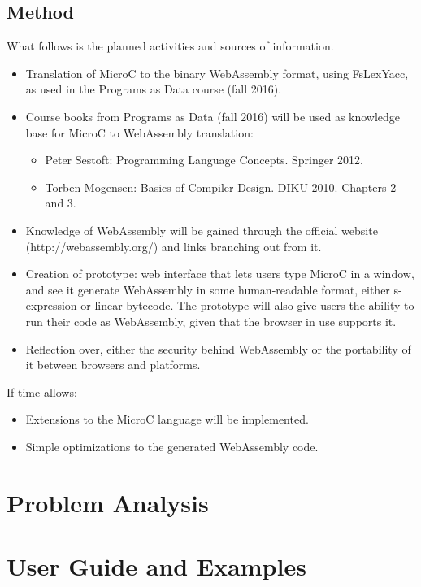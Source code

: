 \documentclass[a4paper]{article}
\makeatletter
\newcommand\footnoteref[1]{\protected@xdef\@thefnmark{\ref{#1}}\@footnotemark}
\makeatother
\begin{document}
\subsection{Method}
What follows is the planned activities and sources of information.
\begin{itemize}
	\item Translation of MicroC to the binary WebAssembly format, using FsLexYacc\footnoteref{footnote:fslexyacc-url}, as used in the Programs as Data course (fall 2016).
	\item Course books from Programs as Data (fall 2016) will be used as knowledge base for MicroC to WebAssembly translation:
		\begin{itemize}
			\item Peter Sestoft: Programming Language Concepts. Springer 2012.
			\item Torben Mogensen: Basics of Compiler Design. DIKU 2010. Chapters 2 and 3.
		\end{itemize}
	\item Knowledge of WebAssembly will be gained through the official website (http://webassembly.org/) and links branching out from it.
	\item Creation of prototype: web interface that lets users type MicroC in a window, and see it generate WebAssembly in some human-readable format, either s-expression or linear bytecode. The prototype will also give users the ability to run their code as WebAssembly, given that the browser in use supports it.
	\item Reflection over, either the security behind WebAssembly or the portability of it between browsers and platforms.
\end{itemize}

\noindent If time allows:
\begin{itemize}
	\item Extensions to the MicroC language will be implemented.
	\item Simple optimizations to the generated WebAssembly code.
\end{itemize}

\section{Problem Analysis}

\section{User Guide and Examples}
\end{document}

